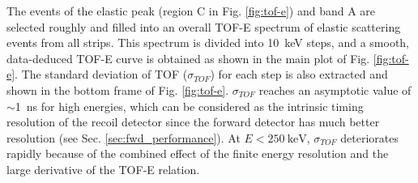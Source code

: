 \documentclass[number,5p]{elsarticle}
\begin{document}
The events of the elastic peak (region C in Fig. \ref{fig:tof-e}) and band A are selected roughly and filled into an overall TOF-E spectrum of elastic scattering events from all strips.
This spectrum is divided into \SI{10}{\keV} steps,  and a smooth, data-deduced TOF-E curve is obtained as shown in the main plot of Fig. \ref{fig:tof-e}.
The standard deviation of TOF ($\sigma_{TOF}$) for each step is also extracted and shown in the bottom frame of Fig. \ref{fig:tof-e}.
$\sigma_{TOF}$ reaches an asymptotic value of $\sim$\SI{1}{\ns} for high energies, which can be considered as the intrinsic timing resolution of the recoil
detector since the forward detector has much better resolution (see Sec. \ref{sec:fwd_performance}).
At $E < \SI{250}{\keV}$, $\sigma_{TOF}$ deteriorates rapidly because of the
combined effect of the finite energy resolution and the large derivative of the TOF-E relation.
\end{document}
